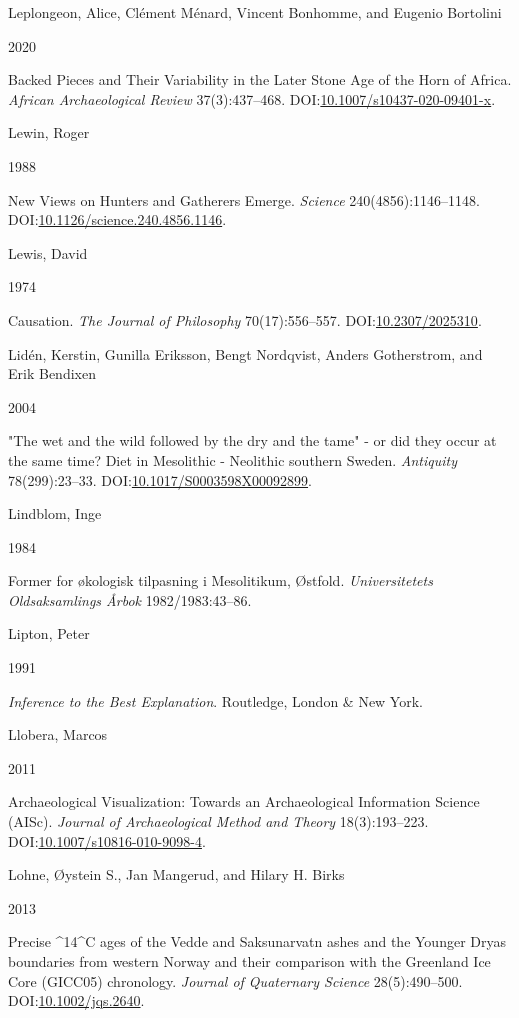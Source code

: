 \documentclass[
  12pt,
  a4paper,
  oneside]{book}
\newlength{\cslhangindent}
\newlength{\csllabelwidth}
\newlength{\cslentryspacingunit} %
\newenvironment{CSLReferences}[2] %
 {%
  \setlength{\parindent}{0pt}
  \ifodd #1
  \let\oldpar\par
  \def\par{\hangindent=\cslhangindent\oldpar}
  \fi
  \setlength{\parskip}{#2\cslentryspacingunit}
 }%
 {}
\newcommand{\CSLBlock}[1]{#1\hfill\break}
\newcommand{\CSLLeftMargin}[1]{\parbox[t]{\csllabelwidth}{#1}}
\newcommand{\CSLRightInline}[1]{\parbox[t]{\linewidth - \csllabelwidth}{#1}\break}
\begin{document}
\begin{CSLReferences}{0}{0}
\leavevmode{}%
\CSLBlock{Leplongeon, Alice, Clément Ménard, Vincent Bonhomme, and Eugenio Bortolini}
\CSLLeftMargin{ 2020}%
\CSLRightInline{{Backed Pieces and Their Variability in the Later Stone Age of the Horn of Africa}. \emph{African Archaeological Review} 37(3):437--468. DOI:\href{https://doi.org/10.1007/s10437-020-09401-x}{10.1007/s10437-020-09401-x}.}

\leavevmode{}%
\CSLBlock{Lewin, Roger}
\CSLLeftMargin{ 1988}%
\CSLRightInline{{New Views on Hunters and Gatherers Emerge}. \emph{Science} 240(4856):1146--1148. DOI:\href{https://doi.org/10.1126/science.240.4856.1146}{10.1126/science.240.4856.1146}.}

\leavevmode{}%
\CSLBlock{Lewis, David}
\CSLLeftMargin{ 1974}%
\CSLRightInline{Causation. \emph{The Journal of Philosophy} 70(17):556--557. DOI:\href{https://doi.org/10.2307/2025310}{10.2307/2025310}.}

\leavevmode{}%
\CSLBlock{Lidén, Kerstin, Gunilla Eriksson, Bengt Nordqvist, Anders Gotherstrom, and Erik Bendixen}
\CSLLeftMargin{ 2004}%
\CSLRightInline{"The wet and the wild followed by the dry and the tame" - or did they occur at the same time? Diet in Mesolithic - Neolithic southern Sweden. \emph{Antiquity} 78(299):23--33. DOI:\href{https://doi.org/10.1017/S0003598X00092899}{10.1017/S0003598X00092899}.}

\leavevmode{}%
\CSLBlock{Lindblom, Inge}
\CSLLeftMargin{ 1984}%
\CSLRightInline{{Former for økologisk tilpasning i Mesolitikum, Østfold}. \emph{Universitetets Oldsaksamlings Årbok} 1982/1983:43--86.}

\leavevmode{}%
\CSLBlock{Lipton, Peter}
\CSLLeftMargin{ 1991}%
\CSLRightInline{\emph{{Inference to the Best Explanation}}. Routledge, London \& New York.}

\leavevmode{}%
\CSLBlock{Llobera, Marcos}
\CSLLeftMargin{ 2011}%
\CSLRightInline{{Archaeological Visualization: Towards an Archaeological Information Science (AISc)}. \emph{Journal of Archaeological Method and Theory} 18(3):193--223. DOI:\href{https://doi.org/10.1007/s10816-010-9098-4}{10.1007/s10816-010-9098-4}.}

\leavevmode{}%
\CSLBlock{Lohne, Øystein S., Jan Mangerud, and Hilary H. Birks}
\CSLLeftMargin{ 2013}%
\CSLRightInline{{Precise \^{}14\^{}C ages of the Vedde and Saksunarvatn ashes and the Younger Dryas boundaries from western Norway and their comparison with the Greenland Ice Core (GICC05) chronology}. \emph{Journal of Quaternary Science} 28(5):490--500. DOI:\href{https://doi.org/10.1002/jqs.2640}{10.1002/jqs.2640}.}


\end{CSLReferences}
\end{document}

